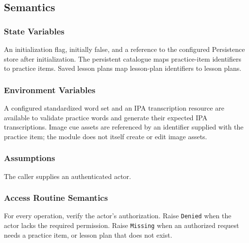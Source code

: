 \documentclass[12pt, titlepage]{article}
\begin{document}
\subsection{Semantics}

\subsubsection{State Variables}
An initialization flag, initially false, and a reference to the configured
Persistence store after initialization. The persistent catalogue maps
practice-item identifiers to practice items. Saved lesson plans map
lesson-plan identifiers to lesson plans.

\subsubsection{Environment Variables}
A configured standardized word set and an IPA transcription resource are
available to validate practice words and generate their expected IPA
transcriptions. Image cue assets are referenced by an identifier supplied
with the practice item; the module does not itself create or edit image
assets.

\subsubsection{Assumptions}
The caller supplies an authenticated actor.

\subsubsection{Access Routine Semantics}
For every operation, verify the actor's authorization. Raise \texttt{Denied}
when the actor lacks the required permission. Raise \texttt{Missing} when
an authorized request needs a practice item, or lesson plan
that does not exist.
\end{document}
